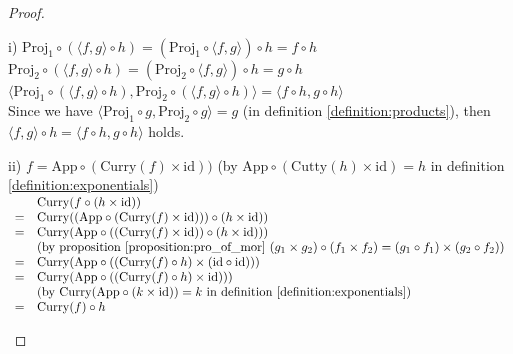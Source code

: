 \begin{proof}
\begin{myitemize}
\item[i)] $ \text{Proj}_1 \circ ( \langle f,g \rangle \circ h ) = ( \text{Proj}_1 \circ \langle f,g \rangle ) \circ h = f \circ h $\\
$ \text{Proj}_2 \circ ( \langle f,g \rangle \circ h ) = ( \text{Proj}_2 \circ \langle f,g \rangle ) \circ h = g \circ h $\\
$ \langle \text{Proj}_1 \circ ( \langle f,g \rangle \circ h ) , \text{Proj}_2 \circ ( \langle f,g \rangle \circ h ) \rangle = \langle f \circ h , g \circ h \rangle $\\
Since we have $ \langle \text{Proj}_1 \circ g , \text{Proj}_2 \circ g \rangle = g $ (in definition \ref{definition:products}), then $ \langle f,g \rangle \circ h = \langle f \circ h , g \circ h \rangle $ holds.
\item[ii)] $ f = \text{App} \circ ( \text{Curry}(f) \times \text{id})) $ (by $ \text{App} \circ ( \text{Cutty}(h) \times \text{id} ) = h $ in definition \ref{definition:exponentials})\\
$
\begin{array}{ll}
  & \text{Curry}(f \circ (h \times \text{id})) \\
= & \text{Curry}(( \text{App} \circ ( \text{Curry}(f) \times \text{id})) ) \circ (h \times \text{id})) \\
= & \text{Curry}( \text{App} \circ (( \text{Curry}(f) \times \text{id})) \circ (h \times \text{id}))) \\
  & (\text{by proposition } \ref{proposition:pro_of_mor} \text{ } ( g_1 \times g_2 ) \circ ( f_1 \times f_2 ) = ( g_1 \circ f_1 ) \times ( g_2 \circ f_2 ) ) \\
= & \text{Curry}( \text{App} \circ (( \text{Curry}(f) \circ h ) \times ( \text{id} \circ \text{id} ))) \\
= & \text{Curry}( \text{App} \circ (( \text{Curry}(f) \circ h ) \times \text{id} ))) \\
  & (\text{by } \text{Curry}( \text{App} \circ (k \times \text{id})) = k \text{ in definition } \ref{definition:exponentials} ) \\
= & \text{Curry}(f) \circ h
\end{array}
$
\end{myitemize}
\end{proof}

